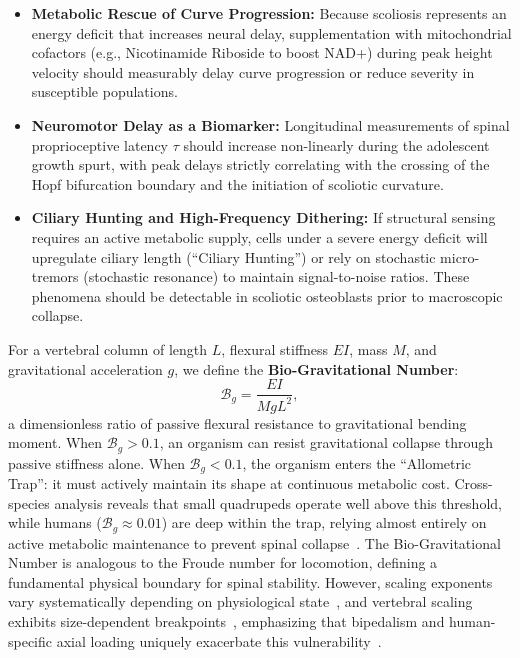 \documentclass[11pt]{article}
\begin{document}
\begin{itemize}
    \item \textbf{Metabolic Rescue of Curve Progression:} Because scoliosis represents an energy deficit that increases neural delay, supplementation with mitochondrial cofactors (e.g., Nicotinamide Riboside to boost NAD+) during peak height velocity should measurably delay curve progression or reduce severity in susceptible populations.
    \item \textbf{Neuromotor Delay as a Biomarker:} Longitudinal measurements of spinal proprioceptive latency $\tau$ should increase non-linearly during the adolescent growth spurt, with peak delays strictly correlating with the crossing of the Hopf bifurcation boundary and the initiation of scoliotic curvature.
    \item \textbf{Ciliary Hunting and High-Frequency Dithering:} If structural sensing requires an active metabolic supply, cells under a severe energy deficit will upregulate ciliary length (``Ciliary Hunting'') or rely on stochastic micro-tremors (stochastic resonance) to maintain signal-to-noise ratios. These phenomena should be detectable in scoliotic osteoblasts prior to macroscopic collapse.
\end{itemize}

For a vertebral column of length $L$, flexural stiffness $EI$, mass $M$, and gravitational acceleration $g$, we define the \textbf{Bio-Gravitational Number}:
\begin{equation}
\mathcal{B}_g = \frac{EI}{M g L^2},
\label{eq:bg_number}
\end{equation}
a dimensionless ratio of passive flexural resistance to gravitational bending moment. When $\mathcal{B}_g > 0.1$, an organism can resist gravitational collapse through passive stiffness alone. When $\mathcal{B}_g < 0.1$, the organism enters the ``Allometric Trap'': it must actively maintain its shape at continuous metabolic cost. Cross-species analysis reveals that small quadrupeds operate well above this threshold, while humans ($\mathcal{B}_g \approx 0.01$) are deep within the trap, relying almost entirely on active metabolic maintenance to prevent spinal collapse~\cite{smit2020adolescent}. The Bio-Gravitational Number is analogous to the Froude number for locomotion, defining a fundamental physical boundary for spinal stability. However, scaling exponents vary systematically depending on physiological state~\cite{glazier2022variable}, and vertebral scaling exhibits size-dependent breakpoints~\cite{smith2024small}, emphasizing that bipedalism and human-specific axial loading uniquely exacerbate this vulnerability~\cite{gorman2009idiopathic}.
\end{document}
